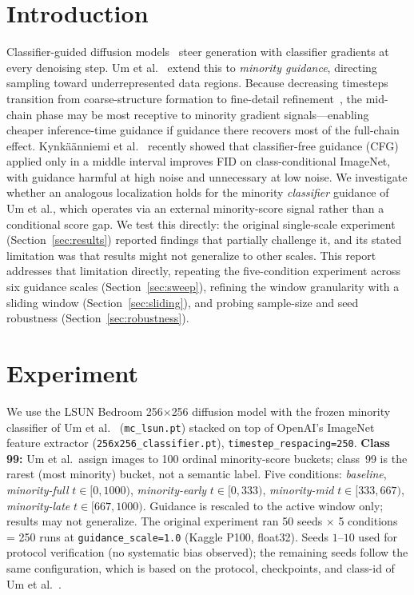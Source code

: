 \documentclass[10pt]{article}
\begin{document}
\section{Introduction}
\label{sec:intro}

Classifier-guided diffusion models~\cite{dhariwal2021diffusion} steer generation
with classifier gradients at every denoising step.  Um et al.\ \cite{um2024minority}
extend this to \emph{minority guidance}, directing sampling toward underrepresented
data regions.  Because decreasing timesteps transition from coarse-structure formation to
fine-detail refinement~\cite{ho2020ddpm}, the mid-chain phase may be most receptive to
minority gradient signals---enabling cheaper inference-time guidance if guidance
there recovers most of the full-chain effect.  Kynk\"{a}\"{a}nniemi et al.\
\cite{kynkaanniemi2024interval} recently showed that classifier-free guidance
(CFG) applied only in a middle interval improves FID on class-conditional
ImageNet, with guidance harmful at high noise and unnecessary at low noise.
We investigate whether an analogous localization holds for the minority
\emph{classifier} guidance of Um et al., which operates via an external
minority-score signal rather than a conditional score gap.  We test this directly: the
original single-scale experiment~\cite{lanzo2026windowed} (Section~\ref{sec:results}) reported findings
that partially challenge it, and its stated limitation was that results might not
generalize to other scales.  This report addresses that limitation directly,
repeating the five-condition experiment across six guidance scales
(Section~\ref{sec:sweep}), refining the window granularity with a sliding window
(Section~\ref{sec:sliding}), and probing sample-size and seed robustness
(Section~\ref{sec:robustness}).

\section{Experiment}
\label{sec:experiment}

We use the LSUN Bedroom 256$\times$256 diffusion model with the frozen minority
classifier of Um et al.~\cite{um2024minority} (\texttt{mc\_lsun.pt}) stacked on
top of OpenAI's ImageNet feature extractor (\texttt{256x256\_classifier.pt}),
\texttt{timestep\_respacing=250}.
\textbf{Class 99:} Um et al.\ assign images to 100 ordinal minority-score
buckets; class~99 is the rarest (most minority) bucket, not a semantic label.  Five conditions:
\emph{baseline}, \emph{minority-full} $t\!\in\![0,1000)$, \emph{minority-early}
$t\!\in\![0,333)$, \emph{minority-mid} $t\!\in\![333,667)$, \emph{minority-late}
$t\!\in\![667,1000)$.  Guidance is rescaled to the active window only; results
may not generalize.  The original experiment ran 50 seeds $\times$ 5 conditions
= 250 runs at \texttt{guidance\_scale=1.0} (Kaggle P100, float32).  Seeds
$1$--$10$ used for protocol verification (no systematic bias observed); the
remaining seeds follow the same configuration, which is based on the protocol,
checkpoints, and class-id of Um et al.~\cite{um2024minority}.
\end{document}
